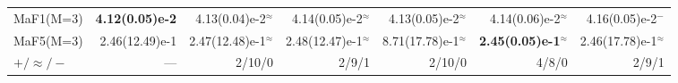 \begin{table}[t]
{\begin{tabular}{lrrrrrr}
MaF1(M=3) & \textbf{4.12(0.05)e-2} & 4.13(0.04)e-2$^{\approx}$ & 4.14(0.05)e-2$^{\approx}$ & 4.13(0.05)e-2$^{\approx}$ & 4.14(0.06)e-2$^{\approx}$ & 4.16(0.05)e-2$^{-}$ \\
MaF5(M=3) & 2.46(12.49)e-1 & 2.47(12.48)e-1$^{\approx}$ & 2.48(12.47)e-1$^{\approx}$ & 8.71(17.78)e-1$^{\approx}$ & \textbf{2.45(0.05)e-1}$^{\approx}$ & 2.46(17.78)e-1$^{\approx}$ \\
\midrule
$+/\approx/-$ & --- & 2/10/0 & 2/9/1 & 2/10/0 & 4/8/0 & 2/9/1 \\
\bottomrule
\end{tabular}%
}
\end{table}